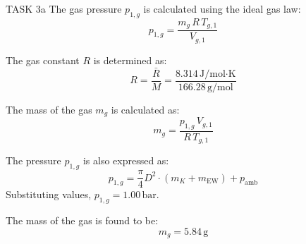 TASK 3a  
The gas pressure \( p_{1,g} \) is calculated using the ideal gas law:  
\[
p_{1,g} = \frac{m_g \, R \, T_{g,1}}{V_{g,1}}
\]  

The gas constant \( R \) is determined as:  
\[
R = \frac{\bar{R}}{M} = \frac{8.314 \, \text{J/mol·K}}{166.28 \, \text{g/mol}}
\]  

The mass of the gas \( m_g \) is calculated as:  
\[
m_g = \frac{p_{1,g} \, V_{g,1}}{R \, T_{g,1}}
\]  

The pressure \( p_{1,g} \) is also expressed as:  
\[
p_{1,g} = \frac{\pi}{4} D^2 \cdot (m_K + m_{\text{EW}}) + p_{\text{amb}}
\]  
Substituting values, \( p_{1,g} = 1.00 \, \text{bar} \).  

The mass of the gas is found to be:  
\[
m_g = 5.84 \, \text{g}
\]  